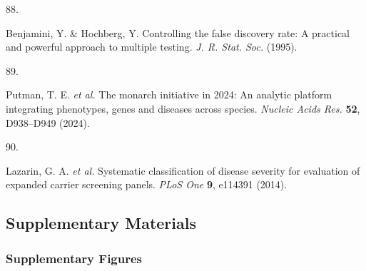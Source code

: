 \documentclass[
]{article}
\newlength{\cslhangindent}
\newlength{\csllabelwidth}
\newenvironment{CSLReferences}[2] %
 {\begin{list}{}{%
  \setlength{\itemindent}{0pt}
  \setlength{\leftmargin}{0pt}
  \setlength{\parsep}{0pt}
  \ifodd #1
   \setlength{\leftmargin}{\cslhangindent}
   \setlength{\itemindent}{-1\cslhangindent}
  \fi
  \setlength{\itemsep}{#2\baselineskip}}}
 {\end{list}}
\newcommand{\CSLLeftMargin}[1]{\parbox[t]{\csllabelwidth}{\strut#1\strut}}
\newcommand{\CSLRightInline}[1]{\parbox[t]{\linewidth - \csllabelwidth}{\strut#1\strut}}
\begin{document}
\begin{CSLReferences}{0}{0}
\CSLLeftMargin{88. }%
\CSLRightInline{Benjamini, Y. \& Hochberg, Y. Controlling the false
discovery rate: A practical and powerful approach to multiple testing.
\emph{J. R. Stat. Soc.} (1995).}

\CSLLeftMargin{89. }%
\CSLRightInline{Putman, T. E. \emph{et al.} The monarch initiative in
2024: An analytic platform integrating phenotypes, genes and diseases
across species. \emph{Nucleic Acids Res.} \textbf{52}, D938--D949
(2024).}

\CSLLeftMargin{90. }%
\CSLRightInline{Lazarin, G. A. \emph{et al.} Systematic classification
of disease severity for evaluation of expanded carrier screening panels.
\emph{PLoS One} \textbf{9}, e114391 (2014).}

\end{CSLReferences}

\hfill\break

\newpage{}

\subsection{Supplementary Materials}\label{supplementary-materials}

\subsubsection{Supplementary Figures}\label{supplementary-figures}
\end{document}
